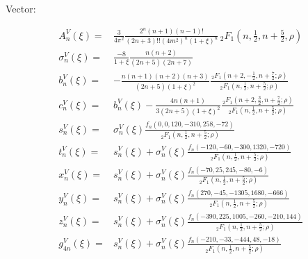 \documentclass[aps,prc,superscriptaddress,showpacs,floatfix, nofootinbib,preprintnumbers,twocolumn]{revtex4}
\begin{document}
Vector:
\begin{scriptsize}
\begin{align}
A^V_n(\xi)=&\frac{3}{4\pi^2}\frac{2^n(n+1)(n-1)!}{(2n+3)!!(4m^2)^n(1+\xi)^n}\,_2F_1(n,\frac{1}{2},n+\frac{5}{2},\rho)\\
\sigma^V_n(\xi)=&\frac{-8}{1+\xi}\frac{n(n+2)}{(2n+5)(2n+7)}\\
b^V_n(\xi)=&-\frac{n(n+1)(n+2)(n+3)}{(2n+5)(1+\xi)^2}\frac{\,_2F_1(n+2,-\frac{1}{2},n+\frac{7}{2};\rho)}{\,_2F_1(n,\frac{1}{2},n+\frac{5}{2};\rho)}\\
c^V_n(\xi)=&b^V_n(\xi)-\frac{4n(n+1)}{3(2n+5)(1+\xi)^2}\frac{\,_2F_1(n+2,\frac{3}{2},n+\frac{7}{2};\rho)}{\,_2F_1(n,\frac{1}{2},n+\frac{5}{2};\rho)}\\
s^V_n(\xi)=&\sigma^V_n(\xi)\frac{f_n(0,0,120,-310,258,-72)}{\,_2F_1(n,\frac{1}{2},n+\frac{5}{2};\rho)}\\
t^V_n(\xi)=&s^V_n(\xi)+\sigma^V_n(\xi)\frac{f_n(-120,-60,-300,1320,-720)}{\,_2F_1(n,\frac{1}{2},n+\frac{5}{2};\rho)}\\
x^V_n(\xi)=&s^V_n(\xi)+\sigma^V_n(\xi)\frac{f_n(-70,25,245,-80,-6)}{\,_2F_1(n,\frac{1}{2},n+\frac{5}{2};\rho)}\\
y^V_n(\xi)=&s^V_n(\xi)+\sigma^V_n(\xi)\frac{f_n(270,-45,-1305,1680,-666)}{\,_2F_1(n,\frac{1}{2},n+\frac{5}{2};\rho)}\\
z^V_n(\xi)=&s^V_n(\xi)+\sigma^V_n(\xi)\frac{f_n(-390,225,1005,-260,-210,144)}{\,_2F_1(n,\frac{1}{2},n+\frac{5}{2};\rho)}\\
g^V_{4n}(\xi)=&s^V_n(\xi)+\sigma^V_n(\xi)\frac{f_n(-210,-33,-444,48,-18)}{\,_2F_1(n,\frac{1}{2},n+\frac{5}{2};\rho)}
\end{align}
\end{scriptsize}
\end{document}
